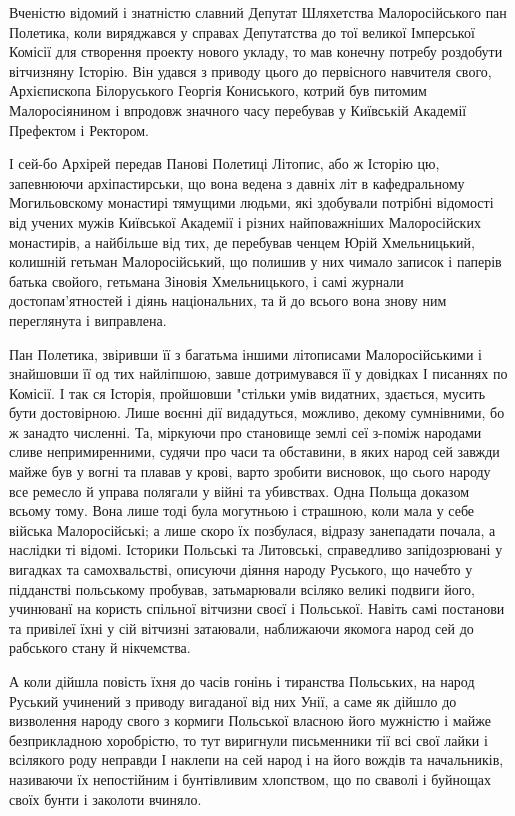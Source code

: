 Вченістю відомий і знатністю славний Депутат Шляхетства Малоросійського пан
Полетика, коли виряджався у справах Депутатства до тої великої Імперської
Комісії для створення проекту нового укладу, то мав конечну потребу роздобути
вітчизняну Історію. Він удався з приводу цього до первісного навчителя свого,
Архієпископа Білоруського Георгія Кониського, котрий був питомим Малоросіянином
і впродовж значного часу перебував у Київській Академії Префектом і Ректором.

І сей-бо Архірей передав Панові Полетиці Літопис, або ж Історію цю, запевнюючи
архіпастирськи, що вона ведена з давніх літ в кафедральному Могильовскому
монастирі тямущими людьми, які здобували потрібні відомості від учених мужів
Київської Академії і різних найповажніших Малоросійских монастирів, а найбільше
від тих, де перебував ченцем Юрій Хмельницький, колишній гетьман
Малоросійський, що полишив у них чимало записок і паперів батька свойого,
гетьмана Зіновія Хмельницького, і самі журнали достопам'ятностей і діянь
національних, та й до всього вона знову ним переглянута і виправлена.

Пан Полетика, звіривши її з багатьма іншими літописами Малоросійськими і
знайшовши її од тих найліпшою, завше дотримувався її у довідках І писаннях по
Комісії. І так ся Історія, пройшовши "стільки умів видатних, здається, мусить
бути достовірною. Лише воєнні дії видадуться, можливо, декому сумнівними, бо ж
занадто численні. Та, міркуючи про становище землі сеї з-поміж народами сливе
непримиренними, судячи про часи та обставини, в яких народ сей завжди майже був
у вогні та плавав у крові, варто зробити висновок, що сього народу все ремесло
й управа полягали у війні та убивствах. Одна Польща доказом всьому тому. Вона
лише тоді була могутньою і страшною, коли мала у себе війська Малоросійські; а
лише скоро їх позбулася, відразу занепадати почала, а наслідки ті відомі.
Історики Польські та Литовські, справедливо запідозрювані у вигадках та
самохвальстві, описуючи діяння народу Руського, що начебто у підданстві
польському пробував, затьмарювали всіляко великі подвиги його, учинюванї на
користь спільної вітчизни своєї і Польської. Навіть самі постанови та привілеї
їхні у сій вітчизні затаювали, наближаючи якомога народ сей до рабського стану
й нікчемства. 

А коли дійшла повість їхня до часів гонінь і тиранства Польських,
на народ Руський учинений з приводу вигаданої від них Унії, а саме як дійшло до
визволення народу свого з кормиги Польської власною його мужністю і майже
безприкладною хоробрістю, то тут виригнули письменники тії всі свої лайки і
всілякого роду неправди І наклепи на сей народ і на його вождів та начальників,
називаючи їх непостійним і бунтівливим хлопством, що по сваволі і буйнощах
своїх бунти і заколоти вчиняло. 

